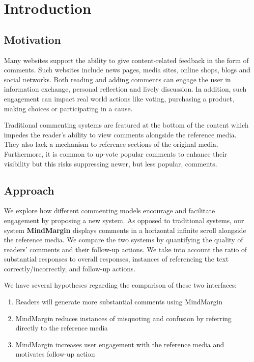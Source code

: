 \section{Introduction}

\subsection{Motivation}

Many websites support the ability to give content-related feedback in the form of comments. Such websites include news pages, media sites, online shops, blogs and social networks. Both reading and adding comments can engage
the user in information exchange, personal reflection and lively discussion. In addition, such engagement can impact real world actions like voting, purchasing a product, making choices or participating in a cause. 

Traditional commenting systems are featured at the bottom of the content which impedes the reader's ability to view comments alongside the reference media. They also lack a mechanism to reference sections of the original media. Furthermore, it is common to up-vote popular comments to enhance their visibility but this risks suppressing newer, but less popular, comments.

\subsection{Approach}

We explore how different commenting models encourage and facilitate engagement by proposing a new system. As opposed to traditional systems, our system \textbf{MindMargin} displays comments in a horizontal infinite scroll alongside the reference media. We compare the two systems by quantifying the quality of readers' comments and their follow-up actions. We take into account the ratio of substantial responses to overall responses, instances of referencing the text correctly/incorrectly, and follow-up actions.

We have several hypotheses regarding the comparison of these two interfaces:
\begin{enumerate}
\item Readers will generate more substantial comments using MindMargin
\item MindMargin reduces instances of misquoting and confusion by referring directly to the reference media
\item MindMargin increases user engagement with the reference media and motivates follow-up action
\end{enumerate}

